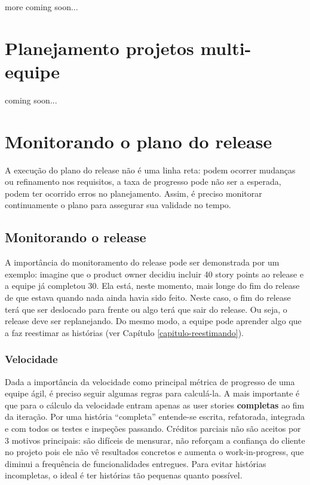 \documentclass[a4paper,abntfigtabnum,noindentfirst]{abnt}
\begin{document}
more coming soon...


\chapter{Planejamento projetos multi-equipe}

coming soon...



\chapter{Monitorando o plano do release}

A execução do plano do release não é uma linha reta: podem ocorrer mudanças ou refinamento nos requisitos, a taxa de progresso pode não ser a esperada, podem ter ocorrido erros no planejamento. Assim, é preciso monitorar continuamente o plano para assegurar sua validade no tempo.

\section{Monitorando o release}

A importância do monitoramento do release pode ser demonstrada por um exemplo: imagine que o product owner decidiu incluir 40 story points ao release e a equipe já completou 30. Ela está, neste momento, mais longe do fim do release de que estava quando nada ainda havia sido feito. Neste caso, o fim do release terá que ser deslocado para frente ou algo terá que sair do release. Ou seja, o release deve ser replanejando. Do mesmo modo, a equipe pode aprender algo que a faz reestimar as histórias (ver Capítulo \ref{capitulo-reestimando}).

\subsection{Velocidade}

Dada a importância da velocidade como principal métrica de progresso de uma equipe ágil, é preciso seguir algumas regras para calculá-la. A mais importante é que para o cálculo da velocidade entram apenas as user stories \textbf{completas} ao fim da iteração. Por uma história ``completa'' entende-se escrita, refatorada, integrada e com todos os testes e inspeções passando. Créditos parciais não são aceitos por 3 motivos principais: são difíceis de mensurar, não reforçam a confiança do cliente no projeto pois ele não vê resultados concretos e aumenta o work-in-progress, que diminui a frequência de funcionalidades entregues. Para evitar histórias incompletas, o ideal é ter histórias tão pequenas quanto possível.
\end{document}
